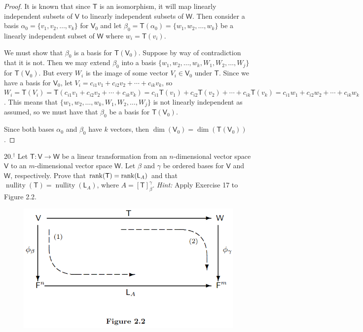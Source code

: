 \documentclass[11pt]{article}
\newcommand{\sbr}[1]{\left[#1\right]}
\newcommand{\cbr}[1]{\{#1\}}
\DeclareMathOperator{\nullity}{nullity}
\begin{document}
\begin{proof}
    It is known that since $\mathsf{T}$ is an isomorphism, it will map linearly independent subsets of $\mathsf{V}$ to linearly independent subsets of $\mathsf{W}$. Then consider a basis $\alpha_0 = \cbr{v_1,v_2,\dots,v_k}$ for $\mathsf{V}_0$ and let $\beta_0 = \mathsf{T}(\alpha_0) = \cbr{w_1,w_2,\dots,w_k}$ be a linearly independent subset of $\mathsf{W}$ where $w_i = \mathsf{T}(v_i)$.

    We must show that $\beta_0$ is a basis for $\mathsf{T}(\mathsf{V}_0)$. Suppose by way of contradiction that it is not. Then we may extend $\beta_0$ into a basis $\cbr{w_1,w_2,\dots,w_k, W_1,W_2,\dots,W_j}$ for $\mathsf{T}(\mathsf{V}_0)$. But every $W_i$ is the image of some vector $V_i\in\mathsf{V}_0$ under $\mathsf{T}$. Since we have a basis for $\mathsf{V}_0$, let $V_i = c_{i1}v_1 + c_{i2}v_2 + \cdots + c_{ik}v_k$, so $W_i = \mathsf{T}(V_i) = \mathsf{T}(c_{i1}v_1 + c_{i2}v_2 + \cdots + c_{ik}v_k) = c_{i1}\mathsf{T}(v_1) + c_{i2}\mathsf{T}(v_2) + \cdots + c_{ik}\mathsf{T}(v_k) = c_{i1}w_1 + c_{i2}w_2 + \cdots + c_{ik}w_k$. This means that $\cbr{w_1,w_2,\dots,w_k, W_1,W_2,\dots,W_j}$ is not linearly independent as assumed, so we must have that $\beta_0$ be a basis for $\mathsf{T}(\mathsf{V}_0)$. 
    
    Since both bases $\alpha_0$ and $\beta_0$ have $k$ vectors, then $\dim(\mathsf{V}_0) = \dim(\mathsf{T}(\mathsf{V}_0))$.
\end{proof}

\newpage

20.$^{\dagger}$ Let $\mathsf{T} : \mathsf{V} \to \mathsf{W}$ be a linear transformation from an $n$-dimensional vector space $\mathsf{V}$ to an $m$-dimensional vector space $\mathsf{W}$. Let $\beta$ and $\gamma$ be ordered bases for $\mathsf{V}$ and $\mathsf{W}$, respectively. Prove that $\rank(\mathsf{T}) = \rank(\mathsf{L}_A)$ and that $\nullity(\mathsf{T}) = \nullity(\mathsf{L}_A)$, where $A = \sbr{\mathsf{T}}_{\beta}^{\gamma}$. \textit{Hint:} Apply Exercise 17 to Figure 2.2.

\begin{figure}[h]
    \centering
    \includegraphics[scale=0.35]{figure}
\end{figure}
\end{document}
